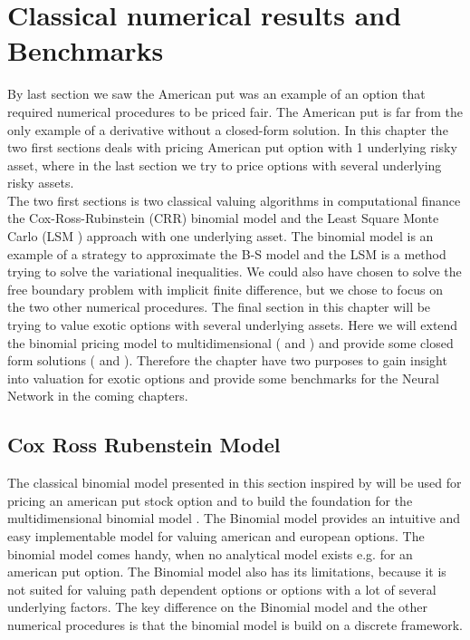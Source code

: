 
\chapter{Classical numerical results and Benchmarks} %

\label{Chapter3} %

By last section we saw the American put was an example of an option that required numerical procedures to be priced fair. The American put is far from the only example of a derivative without a closed-form solution. In this chapter the two first sections deals with pricing American put option with 1 underlying risky asset, where in the last section we try to price options with several underlying risky assets. \\

The two first sections is two classical valuing algorithms in computational finance the Cox-Ross-Rubinstein (CRR) binomial model \parencite{CRR} and the Least Square Monte Carlo (LSM \parencite{lsm}) approach with one underlying asset. The binomial model is an example of a strategy to approximate the B-S model and the LSM is a method trying to solve the variational inequalities. We could also have chosen to solve the free boundary problem with implicit finite difference, but we chose to focus on the two other numerical procedures. The final section in this chapter will be trying to value exotic options with several underlying assets. Here we will extend the binomial pricing model to multidimensional (\parencite{NEK} and \parencite{BEG}) and provide some closed form solutions (\parencite{Johnson87} and \parencite{Ouwehand2006}). Therefore the chapter have two purposes to gain insight into valuation for exotic options and provide some benchmarks for the Neural Network in the coming chapters.

\section{Cox Ross Rubenstein Model}\label{CRR}
The classical binomial model presented in this section inspired by \parencite{CRR,Hull,finKont} will be used for pricing an american put stock option and to build the foundation for the multidimensional binomial model \parencite{BEG}. The Binomial model provides an intuitive and easy implementable model for valuing american and european options. The binomial model comes handy, when no analytical model exists e.g. for an american put option. The Binomial model also has its limitations, because it is not suited for valuing path dependent options or options with a lot of several underlying factors. The key difference on the Binomial model and the other numerical procedures is that the binomial model is build on a discrete framework. \\

